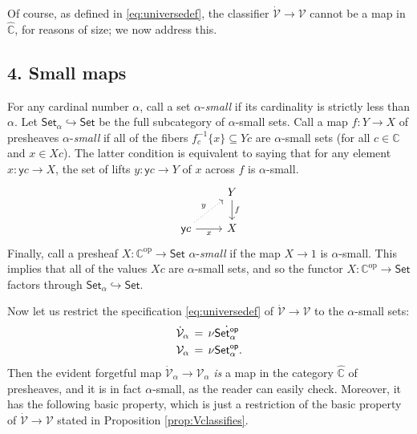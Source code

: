 \documentclass[11pt]{article}
\newcommand{\C}{\ensuremath{\mathbb{C}}}
\newcommand{\op}[1]{\ensuremath{{#1}^{\mathrm{op}}}}
\newcommand{\Set}{\ensuremath{\mathsf{Set}}}
\newcommand{\y}{\ensuremath{\mathsf{y}}} %
\newcommand{\hook}{\ensuremath{\hookrightarrow}}
\renewcommand{\to}{\ensuremath{\rightarrow}}
\newcommand{\SSet}{\ensuremath{\,\dot{\Set}}}
\newcommand{\V}{\ensuremath{\mathcal{V}}}
\newcommand{\VV}{\ensuremath{\dot{\mathcal{V}}}}
\theoremstyle{remark}
\theoremstyle{definition}
\begin{document}
Of course, as defined in \eqref{eq:universedef}, the classifier $\VV\to\V$ cannot be a map in $\widehat{\C}$, for reasons of size; we now address this.  


\subsection*{4. Small maps}
 

For any cardinal number $\alpha$, call a set $\alpha$-\emph{small} if its cardinality is strictly less than $\alpha$.  Let $\Set_\alpha\hook\Set$ be the full subcategory of $\alpha$-small sets.  
Call a map $f:Y\to X$ of presheaves $\alpha$-\emph{small} if all of the fibers $f_c^{-1}\{ x\} \subseteq Yc$ are $\alpha$-small sets (for all $c\in\C$ and $x\in Xc$). The latter condition is equivalent to saying that for any element $x:\y{c} \to X$, the set of lifts $y:\y{c} \to Y$ of $x$ across $f$ is $\alpha$-small.
\begin{equation}\label{eq:smallmap}\textstyle
\begin{tikzcd}
	& Y \ar[d, "f"] \\  
	\y{c} \ar[r,swap,"x"] \ar[ru, dotted, "y"] &  X
 \end{tikzcd}
 \end{equation}
Finally, call a presheaf $X : \op{\C} \to \Set$ $\alpha$-\emph{small} if the map $X\to 1$ is $\alpha$-small.  This implies that all of the values $Xc$ are $\alpha$-small sets, and so the functor $X : \op{\C} \to \Set$ factors through $\Set_\alpha\hook\Set$. 


Now let us restrict the specification \eqref{eq:universedef} of $\VV\to\V$ to the $\alpha$-small sets:
\begin{align}\label{eq:universedefalpha}\textstyle
\VV_\alpha\, &=\, \nu \dot{\Set^{\mathsf{op}}_\alpha}\\  
\V_\alpha\, &=\, \nu \Set^{\mathsf{op}}_\alpha. \notag
 \end{align}
Then the evident forgetful map $\VV_\alpha\to\V_\alpha$ \emph{is} a map in the category $\widehat{\C}$ of presheaves, and it is in fact $\alpha$-small, as the reader can easily check. Moreover, it has the following basic property, which is just a restriction of the basic property of $\VV\to\V$ stated in Proposition \ref{prop:Vclassifies}.
\end{document}
